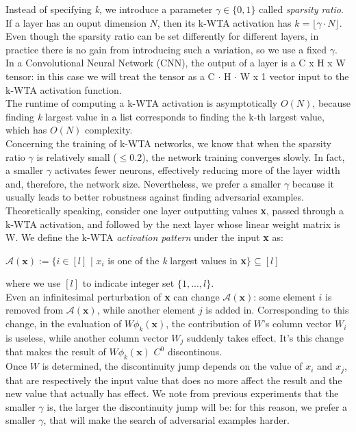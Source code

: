 \documentclass[a4paper]{article}
\begin{document}
Instead of specifying \textit{k}, we introduce a parameter $\gamma \in \{0,1\}$ called \emph{sparsity ratio}. If a layer has an ouput dimension $N$, then its k-WTA activation has  $k = \lfloor\gamma \cdot N\rfloor$. Even though the sparsity ratio can be set differently for different layers, in practice there is no gain from introducing such a variation, so we use a fixed $\gamma$.\\
In a Convolutional Neural Network (CNN), the output of a layer is a C x H x W tensor: in this case we will treat the tensor as a C $\cdot$ H $\cdot$ W x 1 vector input to the k-WTA activation function.\\
The runtime of computing a k-WTA activation is asymptotically $O(N)$, because finding \textit{k} largest value in a list corresponds to finding the k-th largest value, which has $O(N)$ complexity.\\
Concerning the training of k-WTA networks, we know that when the sparsity ratio $\gamma$ is relatively small ($\le 0.2$), the network training converges slowly. In fact, a smaller $\gamma$ activates fewer neurons, effectively reducing more of the layer width and, therefore, the network size. Nevertheless, we prefer a smaller $\gamma$ because it usually leads to better robustness against finding adversarial examples.\\
Theoretically speaking, consider one layer outputting values \textbf{x}, passed through  a k-WTA activation, and followed by the next layer whose linear weight matrix is
W. We define the k-WTA \emph{activation pattern} under the input \textbf{x} as:
\begin{center}
$\mathcal{A}(\textbf{x}) := \{i \in [l]$ | $x_{i}$ is one of the \textit{k} largest values in \textbf{x}$\} \subseteq [l]$
\end{center}
where we use $[l]$ to indicate integer set $\{1,...,l\}$.\\
Even an infinitesimal perturbation of \textbf{x} can change $\mathcal{A}(\textbf{x})$: some element $i$ is removed from $\mathcal{A}(\textbf{x})$, while another element $j$ is added in. Corresponding to this change, in the evaluation of $W\phi_{k}(\textbf{x})$, the contribution of $W$'s column vector $W_{i}$ is useless, while another column vector $W_{j}$ suddenly takes effect. It's this change that makes the result of $W\phi_{k}(\textbf{x})$ $C^0$ discontinous.\\
Once $W$ is determined, the discontinuity jump depends on the value of $x_i$ and $x_j$, that are respectively the input value that does no more affect the result and the new value that actually has effect. We note from previous experiments that the smaller $\gamma$ is, the larger the discontinuity jump will be: for this reason, we prefer a smaller $\gamma$, that will make the search of adversarial examples harder.\\
\end{document}
